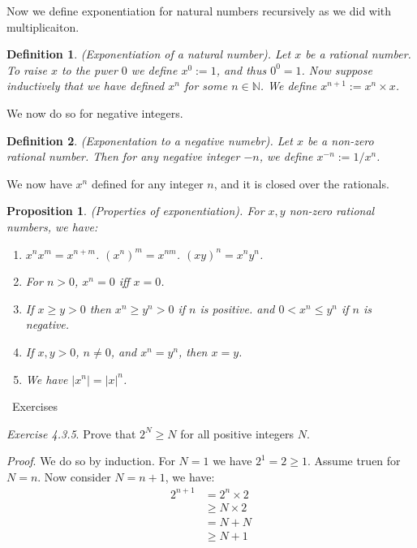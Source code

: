 \documentclass{article}
\newtheorem{definition}{Definition}[subsection]
\newtheorem{proposition}{Proposition}[subsection]
\newcommand{\N}{\mathbb{N}}
\newcommand{\exercisesline}{	%
    \begin{center}
    \textemdash\ Exercises\ \textemdash
    \end{center}
}
\let\it\textit
\begin{document}
Now we define exponentiation for natural numbers recursively as we
did with multiplicaiton. 

\begin{definition}
	(Exponentiation of a natural number). Let $x$ be a 
	rational number. To raise $x$ to the pwer $0$ 
	we define $x^{0} :=1$, and thus $0^0=1$. Now suppose 
	inductively that we have defined $x^{n}$ for some
	$n \in \N$. We define $x^{n+1} := x^{n} \times x$.
\end{definition}

We now do so for negative integers.

\begin{definition}
	(Exponentation to a negative numebr). Let $x$ be a non-zero 
	rational number. Then for any negative integer
	$-n$, we define $x^{-n} := 1/x^n$.
\end{definition}

We now have $x^n$ defined for any integer $n$, and it is closed 
over the rationals. 

\begin{proposition}
\label{properties-of-exponentiation}
	(Properties of exponentiation). For $x,y$ non-zero 
	rational numbers, we have:
	\begin{enumerate}[label=(\alph*)]
		\item $x^n x^m = x^{n+m}$. $(x^n)^m = x^{nm}$. $(xy)^n = x^n y^n$.
		\item For $n>0$, $x^n =0$ iff $x=0$.
		\item If $x \geq y > 0$ then $x^n \geq y^n > 0$ if $n$ is positive.
			and $0 < x^n \leq y^n$ if $n$ is negative.
		\item If $x,y > 0$, $n \neq 0$, and $x^n = y^n$, then $x=y$.
		\item We have $|x^n| = |x|^n$.
	\end{enumerate}
\end{proposition}

\exercisesline

\it{Exercise 4.3.5}. Prove that $2^N \geq N$ for all positive integers $N$. 

\it{Proof}. We do so by induction. For $N=1$ we have $2^1 = 2 \geq 1$. 
Assume truen for $N=n$. Now consider $N=n+1$, we have:
\begin{align*}
	2^{n+1} &= 2^n \times 2 \\ 
		&\geq N \times 2 \tag*{By inductive assumption}\\ 
		&= N + N \\
		&\geq N + 1 \tag*{As $N \geq 1$}
\end{align*}
\end{document}
